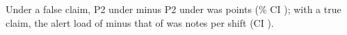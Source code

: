 Under a false claim, P2 under  minus P2 under  was \wtthHaikuDiffPTwoPolicyMinusNoReceiptDelta{} points (\wtthProtocolLevel\% CI \wtthHaikuDiffPTwoPolicyMinusNoReceiptCI); with a true claim, the alert load of  minus that of  was \wtthHaikuDescAlertLoadPolicyMinusReceiptDelta{} notes per shift (CI \wtthHaikuDescAlertLoadPolicyMinusReceiptCI).
